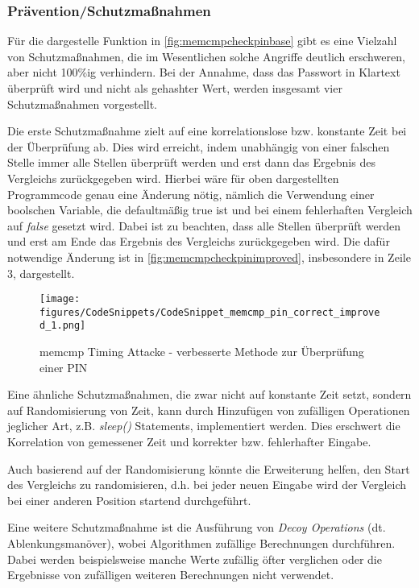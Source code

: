 \documentclass[a4paper,
DIV=13,
12pt,
BCOR=10mm,
department=FakIM,
oneside,
parskip=half,
automark,
listof=totocnumbered,
bibliography=totocnumbered,
acronym=totocnumbered
] {OTHRartcl}
\begin{document}
\subsubsection{Prävention/Schutzmaßnahmen}
Für die dargestelle Funktion in \autoref{fig:memcmpcheckpinbase} gibt es eine Vielzahl von Schutzmaßnahmen, die im Wesentlichen solche Angriffe deutlich erschweren, aber nicht 100\%ig verhindern.
Bei der Annahme, dass das Passwort in Klartext überprüft wird und nicht als gehashter Wert, werden insgesamt vier Schutzmaßnahmen vorgestellt.

Die erste Schutzmaßnahme zielt auf eine korrelationslose bzw. konstante Zeit bei der Überprüfung ab. Dies wird erreicht, indem unabhängig
von einer falschen Stelle immer alle Stellen überprüft werden und erst dann das Ergebnis des Vergleichs zurückgegeben wird.
Hierbei wäre für oben dargestellten Programmcode genau eine Änderung nötig, nämlich die Verwendung einer boolschen Variable,
die defaultmäßig true ist und bei einem fehlerhaften Vergleich auf \textit{false} gesetzt wird. Dabei ist zu beachten, dass
alle Stellen überprüft werden und erst am Ende das Ergebnis des Vergleichs zurückgegeben wird. Die dafür notwendige Änderung ist in \autoref{fig:memcmpcheckpinimproved}, insbesondere in Zeile 3, dargestellt.
\begin{figure}[ht!]
  \begin{center}
    \texttt{[image: figures/CodeSnippets/CodeSnippet\_memcmp\_pin\_correct\_improved\_1.png]}
    \caption{memcmp Timing Attacke - verbesserte Methode zur Überprüfung einer PIN}
    \label{fig:memcmpcheckpinimproved}
  \end{center}
\end{figure}

Eine ähnliche Schutzmaßnahmen, die zwar nicht auf konstante Zeit setzt, sondern auf Randomisierung von Zeit, kann durch Hinzufügen von
zufälligen Operationen jeglicher Art, z.B. \textit{sleep()} Statements, implementiert werden. Dies erschwert die Korrelation von gemessener Zeit und korrekter bzw. fehlerhafter Eingabe.

Auch basierend auf der Randomisierung könnte die Erweiterung helfen, den Start des Vergleichs zu randomisieren, d.h. bei jeder neuen Eingabe wird der Vergleich bei
einer anderen Position startend durchgeführt.

Eine weitere Schutzmaßnahme ist die Ausführung von \textit{Decoy Operations} (dt. Ablenkungsmanöver), wobei Algorithmen zufällige Berechnungen durchführen.
Dabei werden beispielsweise manche Werte zufällig öfter verglichen oder die Ergebnisse von zufälligen weiteren Berechnungen nicht verwendet. \cite{Hardware Hacking Handbook Chapter 14}
\end{document}
